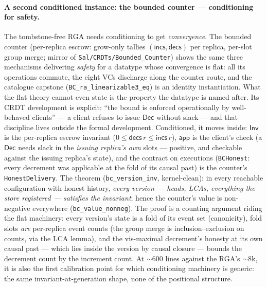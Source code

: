 \documentclass[11pt]{article}
\newcommand{\lean}[1]{\texttt{#1}}
\newcommand{\Inv}{\mathsf{Inv}}
\newcommand{\app}{\mathsf{app}}
\begin{document}
\paragraph{A second conditioned instance: the bounded counter — conditioning
for safety.} The tombstone-free RGA needs conditioning to get
\emph{convergence}. The bounded counter (per-replica escrow: grow-only
tallies $(\mathsf{incs}, \mathsf{decs})$ per replica, per-slot group merge;
mirror of \lean{Sal/CRDTs/Bounded\_Counter}) shows the same three mechanisms
delivering \emph{safety} for a datatype whose convergence is flat: all its
operations commute, the eight VCs discharge along the counter route, and the
catalogue capstone (\lean{BC\_ra\_linearizable3\_eq}) is an identity
instantiation. What the flat theory cannot even state is the property the
datatype is named after. Its CRDT development is explicit: ``the bound is
enforced operationally by well-behaved clients'' --- a client refuses to
issue $\mathsf{Dec}$ without slack --- and that discipline lives outside the
formal development. Conditioned, it moves inside: $\Inv$ is the per-replica
escrow invariant ($0 \le \mathsf{decs}\,r \le \mathsf{incs}\,r$), $\app$ is
the client's check (a $\mathsf{Dec}$ needs slack in the \emph{issuing
replica's own} slots --- positive, and checkable against the issuing
replica's state), and the contract on executions
(\lean{BCHonest}: every decrement was applicable at the fold of its causal
past) is the counter's \lean{HonestDelivery}. The theorem
(\lean{bc\_version\_inv}, kernel-clean): in every reachable configuration
with honest history, \emph{every version --- heads, LCAs, everything the
store registered --- satisfies the invariant}; hence the counter's value is
non-negative everywhere (\lean{bc\_value\_nonneg}). The proof is a
counting argument riding the flat machinery: every version's state is a fold
of its event set (canonicity), fold slots \emph{are} per-replica event
counts (the group merge is inclusion--exclusion on counts, via the LCA
lemma), and the vis-maximal decrement's honesty at its own causal past ---
which lies inside the version by causal closure --- bounds the decrement
count by the increment count. At ${\sim}600$ lines against the RGA's
${\sim}8$k, it is also the first calibration point for which conditioning
machinery is generic: the same invariant-at-generation shape, none of the
positional structure.
\end{document}
